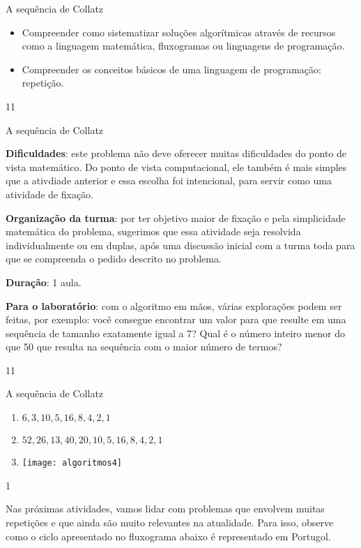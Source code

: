 \begin{objectives}{A sequência de Collatz}
{
\begin{itemize}
\item Compreender como sistematizar soluções algorítmicas através de recursos como a linguagem matemática, fluxogramas ou linguagens de programação.

\item Compreender os conceitos básicos de uma linguagem de programação: repetição.
\end{itemize}
}{1}{1}
\end{objectives}
\begin{sugestions}{A sequência de Collatz}
{
\textbf{Dificuldades}: este problema não deve oferecer muitas dificuldades do ponto de vista matemático. Do ponto de vista computacional, ele também é mais simples que a ativdiade anterior e essa escolha foi intencional, para servir como uma atividade de fixação.

\textbf{Organização da turma}: por ter objetivo maior de fixação e pela simplicidade matemática do problema, sugerimos que essa atividade seja resolvida individualmente ou em duplas, após uma discussão inicial com a turma toda para que se compreenda o pedido descrito no problema.

\textbf{Duração}: 1 aula.

\textbf{Para o laboratório}: com o algoritmo em mãos, várias explorações podem ser feitas, por exemplo: você consegue encontrar um valor para  que resulte em uma sequência de tamanho exatamente igual a 7? Qual é o número inteiro menor do que 50 que resulta na sequência com o maior número de termos?
}{1}{1}
\end{sugestions}
\begin{answer}{A sequência de Collatz}
{
\begin{enumerate}
\item $6, 3, 10, 5, 16, 8, 4, 2, 1$
\item $52, 26, 13, 40, 20, 10, 5, 16, 8, 4, 2, 1$
\item {}
{
\texttt{[image: algoritmos4]}
}
\end{enumerate}
}{1}
\end{answer}


Nas próximas atividades, vamos lidar com problemas que envolvem muitas repetições e que ainda são muito relevantes na atualidade. Para isso, observe como o ciclo apresentado no fluxograma abaixo é representado em Portugol.

